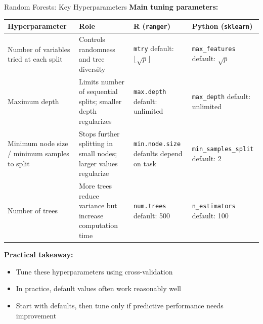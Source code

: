 \documentclass[11pt]{beamer}
\begin{document}
\begin{frame}{Random Forests: Key Hyperparameters}
	\textbf{Main tuning parameters:}

	\begin{table}
		\tiny
		\begin{tabular}{|p{2.7cm}|p{3.2cm}|p{2.1cm}|p{2.3cm}|}
			\hline
			\textbf{Hyperparameter} & \textbf{Role} & \textbf{R (\texttt{ranger})} & \textbf{Python (\texttt{sklearn})} \\
			\hline
			Number of variables tried at each split &
			Controls randomness and tree diversity &
			\texttt{mtry} \newline default: $\lfloor \sqrt{p} \rfloor$ &
			\texttt{max\_features} \newline default: $\sqrt{p}$ \\
			\hline
			Maximum depth &
			Limits number of sequential splits; smaller depth regularizes &
			\texttt{max.depth} \newline default: unlimited &
			\texttt{max\_depth} \newline default: unlimited \\
			\hline
			Minimum node size /
			minimum samples to split &
			Stops further splitting in small nodes; larger values regularize &
			\texttt{min.node.size} \newline defaults depend on task &
			\texttt{min\_samples\_split} \newline default: 2 \\
			\hline
			Number of trees &
			More trees reduce variance but increase computation time &
			\texttt{num.trees} \newline default: 500 &
			\texttt{n\_estimators} \newline default: 100 \\
			\hline
		\end{tabular}
	\end{table}

	\vspace{0.2cm}

	\textbf{Practical takeaway:}
	\begin{itemize}
		\small
		\setlength{\itemsep}{0.1cm}
		\item Tune these hyperparameters using cross-validation
		\item In practice, default values often work reasonably well
		\item Start with defaults, then tune only if predictive performance needs improvement
	\end{itemize}
\end{frame}
\end{document}
